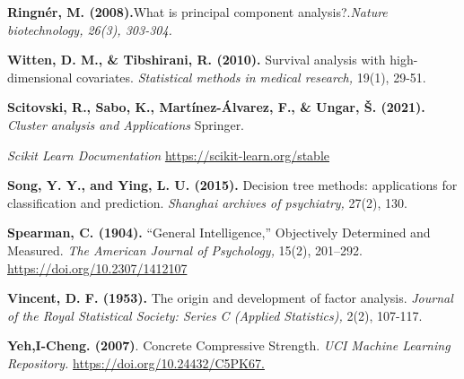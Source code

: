 \begin{thebibliography}{99}
\textbf{Ringnér, M. (2008).}What is principal component analysis?.\emph{Nature biotechnology, 26(3), 303-304.}

\textbf{Witten, D. M., \& Tibshirani, R. (2010).} Survival analysis with high-dimensional covariates. \emph{Statistical methods in medical research,} 19(1), 29-51.

\textbf{Scitovski, R., Sabo, K., Martínez-Álvarez, F., \& Ungar, Š. (2021).} \emph{Cluster analysis and Applications} Springer.

 \textit{Scikit Learn Documentation} \url{https://scikit-learn.org/stable}

\textbf{Song, Y. Y., and Ying, L. U. (2015).} Decision tree methods: applications for classification and prediction. \emph{Shanghai archives of psychiatry,} 27(2), 130.

\textbf{Spearman, C. (1904).} “General Intelligence,” Objectively Determined and Measured. \emph{The American Journal of Psychology,} 15(2), 201–292. \url{https://doi.org/10.2307/1412107}

\textbf{Vincent, D. F. (1953).} The origin and development of factor analysis. \emph{Journal of the Royal Statistical Society: Series C (Applied Statistics),} 2(2), 107-117.






\textbf{Yeh,I-Cheng. (2007)}. Concrete Compressive Strength. \emph{UCI Machine Learning Repository.} \url{https://doi.org/10.24432/C5PK67.}

\end{thebibliography}
 